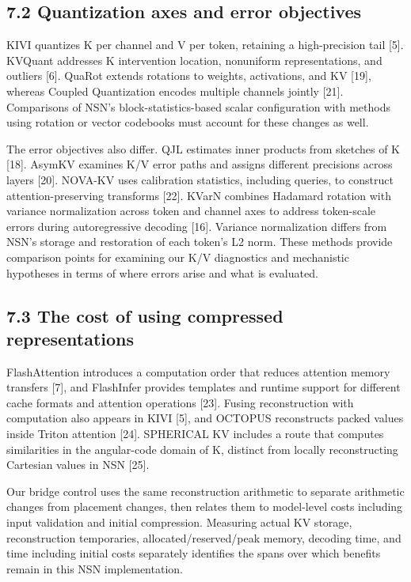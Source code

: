 \documentclass[10pt,a4paper]{article}
\begin{document}
\subsection{7.2 Quantization axes and error objectives}\label{quantization-axes-and-error-objectives}

KIVI quantizes K per channel and V per token, retaining a high-precision tail {[}5{]}. KVQuant addresses K intervention location, nonuniform representations, and outliers {[}6{]}. QuaRot extends rotations to weights, activations, and KV {[}19{]}, whereas Coupled Quantization encodes multiple channels jointly {[}21{]}. Comparisons of NSN's block-statistics-based scalar configuration with methods using rotation or vector codebooks must account for these changes as well.

The error objectives also differ. QJL estimates inner products from sketches of K {[}18{]}. AsymKV examines K/V error paths and assigns different precisions across layers {[}20{]}. NOVA-KV uses calibration statistics, including queries, to construct attention-preserving transforms {[}22{]}. KVarN combines Hadamard rotation with variance normalization across token and channel axes to address token-scale errors during autoregressive decoding {[}16{]}. Variance normalization differs from NSN's storage and restoration of each token's L2 norm. These methods provide comparison points for examining our K/V diagnostics and mechanistic hypotheses in terms of where errors arise and what is evaluated.

\subsection{7.3 The cost of using compressed representations}\label{the-cost-of-using-compressed-representations}

FlashAttention introduces a computation order that reduces attention memory transfers {[}7{]}, and FlashInfer provides templates and runtime support for different cache formats and attention operations {[}23{]}. Fusing reconstruction with computation also appears in KIVI {[}5{]}, and OCTOPUS reconstructs packed values inside Triton attention {[}24{]}. SPHERICAL KV includes a route that computes similarities in the angular-code domain of K, distinct from locally reconstructing Cartesian values in NSN {[}25{]}.

Our bridge control uses the same reconstruction arithmetic to separate arithmetic changes from placement changes, then relates them to model-level costs including input validation and initial compression. Measuring actual KV storage, reconstruction temporaries, allocated/reserved/peak memory, decoding time, and time including initial costs separately identifies the spans over which benefits remain in this NSN implementation.
\end{document}
